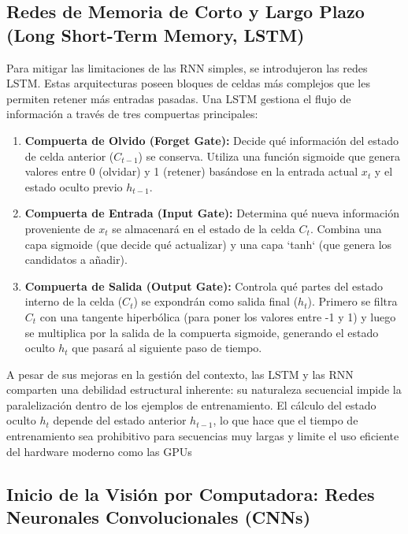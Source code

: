 \documentclass[11pt, a4paper]{article}
\begin{document}
\subsection{Redes de Memoria de Corto y Largo Plazo (Long Short-Term Memory, LSTM)}

Para mitigar las limitaciones de las RNN simples, se introdujeron las redes LSTM. Estas arquitecturas poseen bloques de celdas más complejos que les permiten retener más entradas pasadas.
 Una LSTM gestiona el flujo de información a través de tres compuertas principales:
\begin{enumerate}
    \item \textbf{Compuerta de Olvido (Forget Gate):} Decide qué información del estado de celda anterior ($C_{t-1}$) se conserva. Utiliza una función sigmoide que genera valores entre 0 (olvidar)
    y 1 (retener) basándose en la entrada actual $x_t$ y el estado oculto previo $h_{t-1}$.
    
    \item \textbf{Compuerta de Entrada (Input Gate):} Determina qué nueva información proveniente de $x_t$ se almacenará en el estado de la celda $C_t$. Combina una capa sigmoide (que decide
    qué actualizar) y una capa `tanh` (que genera los candidatos a añadir).
    
    \item \textbf{Compuerta de Salida (Output Gate):} Controla qué partes del estado interno de la celda ($C_t$) se expondrán como salida final ($h_t$). Primero se filtra $C_t$ con una tangente
    hiperbólica (para poner los valores entre -1 y 1) y luego se multiplica por la salida de la compuerta sigmoide, generando el estado oculto $h_t$ que pasará al siguiente paso de tiempo.
\end{enumerate}

A pesar de sus mejoras en la gestión del contexto, las LSTM y las RNN comparten una debilidad estructural inherente: su naturaleza secuencial impide la paralelización dentro de los ejemplos
de entrenamiento. El cálculo del estado oculto $h_t$ depende del estado anterior $h_{t-1}$, lo que hace que el tiempo de entrenamiento sea prohibitivo para secuencias muy largas y limite el 
uso eficiente del hardware moderno como las GPUs

\subsection{Inicio de la Visión por Computadora: Redes Neuronales Convolucionales (CNNs)}
\end{document}
